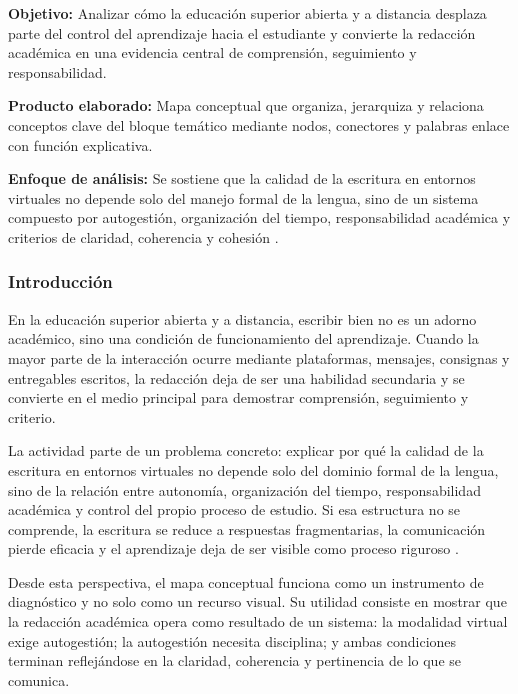 \begin{portafolioabstract}
	\textbf{Objetivo:} Analizar cómo la educación superior abierta y a distancia desplaza parte del control del aprendizaje hacia el estudiante y convierte la redacción académica en una evidencia central de comprensión, seguimiento y responsabilidad.

	\textbf{Producto elaborado:} Mapa conceptual que organiza, jerarquiza y relaciona conceptos clave del bloque temático mediante nodos, conectores y palabras enlace con función explicativa.

	\textbf{Enfoque de análisis:} Se sostiene que la calidad de la escritura en entornos virtuales no depende solo del manejo formal de la lengua, sino de un sistema compuesto por autogestión, organización del tiempo, responsabilidad académica y criterios de claridad, coherencia y cohesión \citep{nunezcortesEscrituraAcademicaTeoria2015,correaManualBasicoEscritura2018,vitoriaEscrituraAcademicaFormacion2019}.
\end{portafolioabstract}

\subsubsection{Introducción}

En la educación superior abierta y a distancia, escribir bien no es un adorno académico, sino una condición de funcionamiento del aprendizaje. Cuando la mayor parte de la interacción ocurre mediante plataformas, mensajes, consignas y entregables escritos, la redacción deja de ser una habilidad secundaria y se convierte en el medio principal para demostrar comprensión, seguimiento y criterio.

La actividad parte de un problema concreto: explicar por qué la calidad de la escritura en entornos virtuales no depende solo del dominio formal de la lengua, sino de la relación entre autonomía, organización del tiempo, responsabilidad académica y control del propio proceso de estudio. Si esa estructura no se comprende, la escritura se reduce a respuestas fragmentarias, la comunicación pierde eficacia y el aprendizaje deja de ser visible como proceso riguroso \citep{correaManualBasicoEscritura2018,nunezcortesEscrituraAcademicaTeoria2015}.

Desde esta perspectiva, el mapa conceptual funciona como un instrumento de diagnóstico y no solo como un recurso visual. Su utilidad consiste en mostrar que la redacción académica opera como resultado de un sistema: la modalidad virtual exige autogestión; la autogestión necesita disciplina; y ambas condiciones terminan reflejándose en la claridad, coherencia y pertinencia de lo que se comunica.

